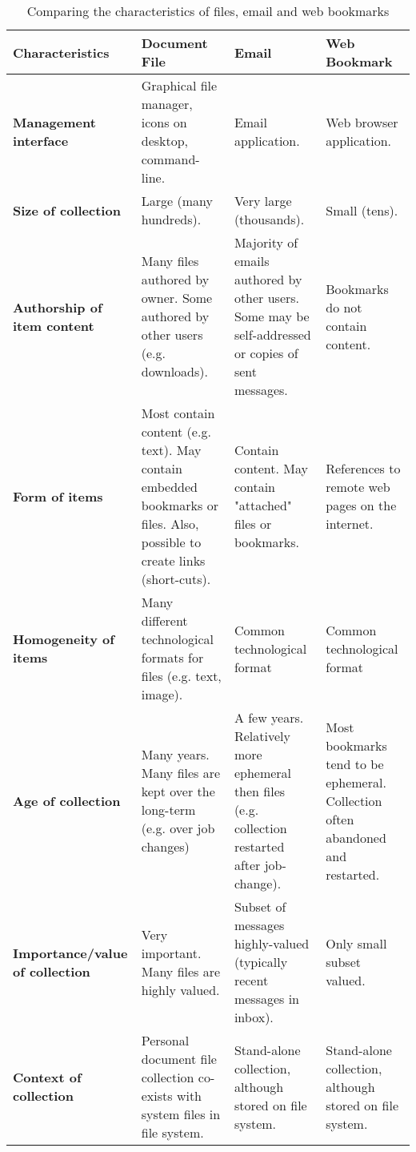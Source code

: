 \begin{table}[hbtp]
\begin{center}
\begin{footnotesize}
\setlength{\extrarowheight}{2pt}
\begin{tabular}{|p{2.5cm}|p{3.5cm}|p{3.5cm}|p{3.5cm}|}
\hline
{\bf Characteristics} & {\bf Document File} & {\bf Email} & {\bf Web Bookmark} \\
\hline
{\bf Management interface} & Graphical file manager, icons on desktop, command-line. & Email application. & Web browser application. \\
\hline
{\bf Size of collection} & Large (many hundreds). & Very large (thousands). & Small (tens). \\
\hline
{\bf Authorship of item content} & Many files authored by owner.  Some authored by other users (e.g. downloads).  & Majority of emails authored by other users. Some may be self-addressed or copies of sent messages. & Bookmarks do not contain content. \\
\hline
{\bf Form of items} & Most contain content (e.g. text).  May contain embedded bookmarks or files. Also, possible to create links (short-cuts).  & Contain content. May contain "attached" files or bookmarks. & References to remote web pages on the internet. \\
\hline
{\bf Homogeneity of items} & Many different technological formats for files (e.g. text, image). & Common technological format & Common technological format \\
\hline
{\bf Age of collection} & Many years. Many files are kept over the long-term (e.g. over job changes) & A few years. Relatively more ephemeral then files (e.g. collection  restarted after job-change). & Most bookmarks tend to be ephemeral. Collection often abandoned and restarted. \\
\hline
{\bf Importance/value of collection} & Very important. Many files are highly valued. & Subset of messages highly-valued (typically recent messages in inbox).  & Only small subset valued. \\
\hline
{\bf Context of collection} & Personal document file collection co-exists with system files in file system. & Stand-alone collection, although stored on file system. & Stand-alone collection, although stored on file system. \\
\hline
\end{tabular}  
\end{footnotesize}
\caption{Comparing the characteristics of files, email and web bookmarks}
\label{table:chapter3_item_characteristics}
\end{center}
\end{table}
\normalsize


